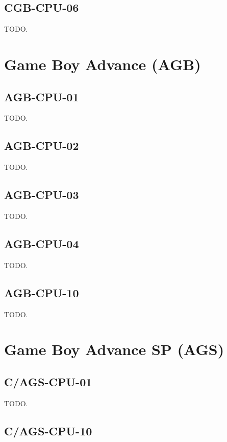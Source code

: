 \subsection{CGB-CPU-06}

TODO.

\section{Game Boy Advance (AGB)}

\subsection{AGB-CPU-01}

TODO.

\subsection{AGB-CPU-02}

TODO.

\subsection{AGB-CPU-03}

TODO.

\subsection{AGB-CPU-04}

TODO.

\subsection{AGB-CPU-10}

TODO.

\section{Game Boy Advance SP (AGS)}

\subsection{C/AGS-CPU-01}

TODO.

\subsection{C/AGS-CPU-10}

